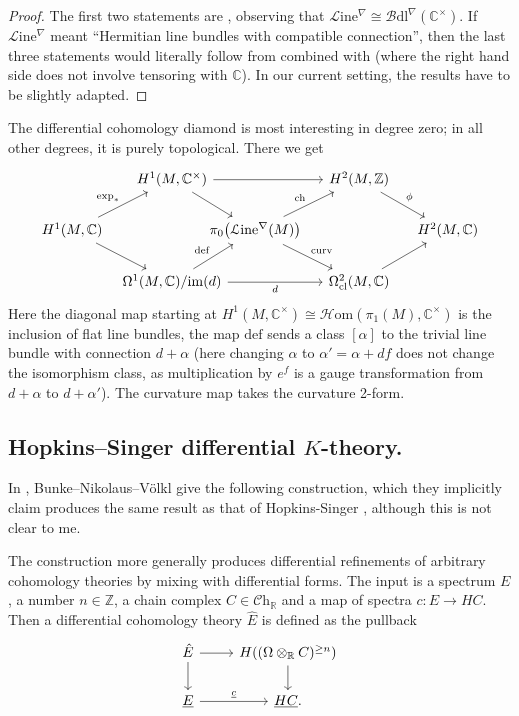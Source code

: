 \documentclass[a4paper]{book}
\newcommand{\lB}{\mathcal{B}}
\newcommand{\lC}{\mathcal{C}}
\newcommand{\bC}{\mathbb{C}}
\newcommand{\lH}{\mathcal{H}}
\newcommand{\lL}{\mathcal{L}}
\newcommand{\bR}{\mathbb{R}}
\newcommand{\bZ}{\mathbb{Z}}
\newcommand{\Hom}{\lH\mathrm{om}} %
\newcommand{\Ch}{\lC\mathrm{h}} %
\newcommand{\ch}{\mathrm{ch}}
\newcommand{\Bdl}{\lB\mathrm{dl}} %
\renewcommand{\Line}{\lL\mathrm{ine}} %
\theoremstyle{definition}
\theoremstyle{remark}
\numberwithin{equation}{section}
\begin{document}
\begin{proof}
The first two statements are \cite[Lemma~5.2]{bunkenikolausvoelkl2016diffcoh}, observing that $\Line^\nabla \cong \Bdl^\nabla(\bC^\times)$. If $\Line^\nabla$ meant ``Hermitian line bundles with compatible connection'', then the last three statements would literally follow from \cite[Lemma 5.4]{bunkenikolausvoelkl2016diffcoh} combined with \cite[Lemma 4.5]{bunkenikolausvoelkl2016diffcoh} (where the right hand side does not involve tensoring with $\bC$). In our current setting, the results have to be slightly adapted.
\end{proof}

The differential cohomology diamond is most interesting in degree zero; in all other degrees, it is purely topological. There we get
\begin{equation*}
\begin{tikzcd}[column sep=0.4cm]
&[-0.2cm] 
H^1(M, \bC^\times)
\ar[dr]\ar[rr]
&[-1cm] & 
H^2(M, \bZ)
\ar[dr, "\phi"] 
&
\\ 	
H^1(M, \bC)
\ar[ur, "\exp_*"]
\ar[dr]
& & 
\pi_0\bigl(\Line^\nabla(M)\bigr)
\ar[ur, "\ch"]
\ar[dr, "\mathrm{curv}"]
& & 
H^2(M, \bC)
\\
& 
\Omega^{1}(M, \bC)/\mathrm{im}(d)
\ar[ur, "\mathrm{def}"]
\ar[rr, "d"']
& & 
\Omega^2_{\mathrm{cl}}(M, \bC) 
\ar[ur]
&
\end{tikzcd}
\end{equation*}
Here the diagonal map starting at $H^1(M, \bC^\times) \cong \Hom(\pi_1(M), \bC^\times)$ is the inclusion of flat line bundles, the map $\mathrm{def}$ sends a class $[\alpha]$ to the trivial line bundle with connection $d + \alpha$ (here changing $\alpha$ to $\alpha' = \alpha + df$ does not change the isomorphism class, as multiplication by $e^f$ is a gauge transformation from $d + \alpha$ to $d+ \alpha'$). The curvature map takes the curvature 2-form.

\subsection{Hopkins--Singer differential \texorpdfstring{$K$}{K}-theory.}
In \cite[\S{4.4}]{bunkenikolausvoelkl2016diffcoh}, Bunke--Nikolaus--V{\"o}lkl give the following construction, which they implicitly claim produces the same result as that of Hopkins-Singer \cite{hopkinssinger2005diffcoh}, although this is not clear to me.

The construction more generally produces differential refinements of arbitrary cohomology theories by mixing with differential forms. The input is a spectrum $E$, a number $n \in \bZ$, a chain complex $C \in \Ch_{\bR}$ and a map of spectra $c : E \to HC$. Then a differential cohomology theory $\hat{E}$ is defined as the pullback
\[
\begin{tikzcd}
\hat{E} 
\ar[r] \ar[d] & H((\Omega \otimes_\bR C)^{\geq n})\ar[d]
\\
\underline{E} \ar[r, "\underline{c}"]
& \underline{HC}.
\end{tikzcd}
\]
\end{document}
